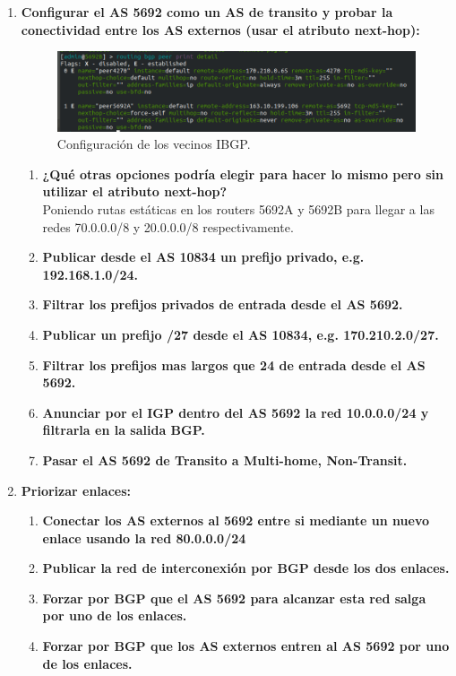 \documentclass[letterpaper,12pt]{article}
\begin{document}
\begin{enumerate}
		\item \textbf{Configurar el AS 5692 como un AS de transito y probar la conectividad entre los AS externos (usar el atributo next-hop):}
		
		\begin{figure}[H]
			\centering \includegraphics[width=1\columnwidth]{figure/bgp-peer.png}
			\caption{
				\label{fig:samplesetup} %
				Configuración de los vecinos IBGP.
			}
		\end{figure}
		
		\begin{enumerate}
			\item \textbf{¿Qué otras opciones podría elegir para hacer lo mismo pero sin utilizar el atributo next-hop?}\\
			Poniendo rutas estáticas en los routers 5692A y 5692B para llegar a las redes 70.0.0.0/8 y 20.0.0.0/8 respectivamente.
			\item \textbf{Publicar desde el AS 10834 un prefijo privado, e.g. 192.168.1.0/24.}
			\item \textbf{Filtrar los prefijos privados de entrada desde el AS 5692.}
			\item \textbf{Publicar un prefijo /27 desde el AS 10834, e.g. 170.210.2.0/27.}
			\item \textbf{Filtrar los prefijos mas largos que 24 de entrada desde el AS 5692.}
			\item \textbf{Anunciar por el IGP dentro del AS 5692 la red 10.0.0.0/24 y filtrarla en la salida BGP.}
			\item \textbf{Pasar el AS 5692 de Transito a Multi-home, Non-Transit.}
		\end{enumerate}
		
		\item \textbf{Priorizar enlaces:}
		\begin{enumerate}
			\item \textbf{Conectar los AS externos al 5692 entre si mediante un nuevo enlace usando la red 80.0.0.0/24}
			\item \textbf{Publicar la red de interconexión por BGP desde los dos enlaces.}
			\item \textbf{Forzar por BGP que el AS 5692 para alcanzar esta red salga por uno de los enlaces.}
			\item \textbf{Forzar por BGP que los AS externos entren al AS 5692 por uno de los enlaces.}
		\end{enumerate}
	\end{enumerate}
\end{document}
